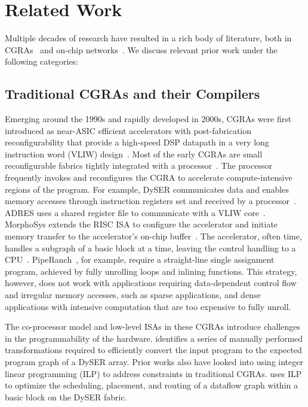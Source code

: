 \chapter{Related Work} \label{sec:related}

Multiple decades of research have resulted in a rich body of literature, both in CGRAs~\cite{cgraSurvey1, cgraSurvey2} and on-chip networks~\cite{ocn-synthesis}. We discuss relevant prior work under the following categories:

\section{Traditional CGRAs and their Compilers}
Emerging around the 1990s and rapidly developed in 2000s, CGRAs were first introduced as near-ASIC efficient accelerators with
post-fabrication reconfigurability that provide a high-speed 
DSP datapath in a very long instruction word (VLIW) design~\cite{cgrasurvey,cgra1,cgra2,adres,trips,pactxpp,dyser,ti}.
Most of the early CGRAs are small reconfigurable fabrics tightly integrated with a 
processor~\cite{dyser, adres,morphosys,piperanch}. 
The processor frequently invokes and reconfigures the CGRA to accelerate compute-intensive regions of the program.
For example, DySER communicates data and enables memory accesses through instruction registers set and
received by a processor~\cite{dyser}.
ADRES uses a shared register file to communicate with a VLIW core~\cite{adres}.
MorphoSys extends the RISC ISA to configure the accelerator and initiate memory transfer
to the accelerator's on-chip buffer~\cite{morphosys}.
The accelerator, often time, handles a subgraph of a basic block at a time, leaving the control
handling to a CPU~\cite{dyser, adres, piperanch}. 
PipeRanch~\cite{piperanch}, for example, require a straight-line single assignment program, 
achieved by fully unrolling loops and inlining functions.
This strategy, however, does not work with applications requiring data-dependent control flow and irregular memory
accesses, such as sparse applications, and dense applications with intensive computation that are
too expensive to fully unroll.

The co-processor model and low-level ISAs in these CGRAs introduce challenges in the programmability
of the hardware.
\cite{dyser} identifies a series of manually performed transformations required to efficiently convert the input program to the expected program graph of a DySER array.
Prior works also have looked into using integer linear programming (ILP) to address constraints in traditional CGRAs. 
\cite{nowatzki} uses ILP to optimize the scheduling, placement, and routing of a dataflow graph within a basic block on the DySER fabric.

